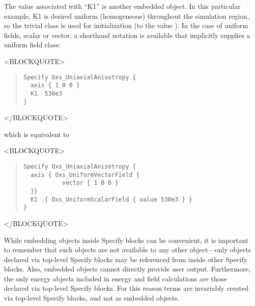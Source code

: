\fussy
The value associated with ``K1'' is another embedded 
object.  In this particular example, K1 is desired uniform (homogeneous)
throughout the simulation region, so the trivial
 class is used for initialization (to the value
).  In the case of
uniform fields, scalar or vector, a shorthand notation is available that
implicitly supplies a uniform  field class:
\begin{rawhtml}<BLOCKQUOTE>\end{rawhtml}
\begin{quote}
\begin{verbatim}
Specify Oxs_UniaxialAnisotropy {
  axis { 1 0 0 }
  K1  530e3
}
\end{verbatim}
\end{quote}
\begin{rawhtml}</BLOCKQUOTE>\end{rawhtml}
which is equivalent to
\begin{rawhtml}<BLOCKQUOTE>\end{rawhtml}
\begin{quote}
\begin{verbatim}
Specify Oxs_UniaxialAnisotropy {
  axis { Oxs_UniformVectorField {
           vector { 1 0 0 }
  }}
  K1  { Oxs_UniformScalarField { value 530e3 } }
}
\end{verbatim}
\end{quote}
\begin{rawhtml}</BLOCKQUOTE>\end{rawhtml}

While embedding  objects inside Specify blocks can be
convenient, it is important to remember that such objects are not
available to any other  object---only objects declared via
top-level Specify blocks may be referenced from inside other
Specify blocks.  Also, embedded  objects cannot
directly provide user output.  Furthermore, the only 
energy objects included in energy and field calculations are those
declared via top-level Specify blocks.  For this reason
 terms are invariably created via top-level Specify
blocks, and not as embedded objects.

